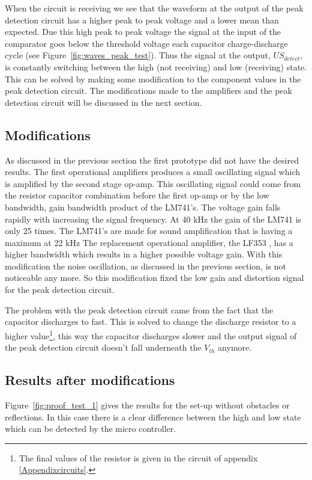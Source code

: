 When the circuit is receiving we see that the waveform at the output of the peak detection circuit has a higher peak to peak voltage and a lower mean than expected.
Due this high peak to peak voltage the signal at the input of the comparator goes below the threshold voltage each capacitor charge-discharge cycle (see Figure~\ref{fig:waves_peak_test}).
Thus the signal at the output, $US_{detect}$, is constantly switching between the high (not receiving) and low (receiving) state.
This can be solved by making some modification to the component values in the peak detection circuit.
The modifications made to the amplifiers and the peak detection circuit will be discussed in the next section.


\subsection{Modifications}
\label{chap:mod}
As discussed in the previous section the first prototype did not have the desired results. The first operational amplifiers produces a small oscillating signal which is amplified by the second stage op-amp. This oscillating signal could come from the resistor capacitor combination before the first op-amp or by the low bandwidth, gain bandwidth product of the LM741's. The voltage gain falls rapidly with increasing the signal frequency. At 40 kHz the gain of the LM741 is only 25 times. The LM741's are made for sound amplification that is having a maximum at 22 kHz The replacement operational amplifier, the LF353 \cite{LF353}, has a higher bandwidth which results in a higher possible voltage gain. With this modification the noise oscillation, as discussed in the previous section, is not noticeable any more. So this modification fixed the low gain and distortion signal for the peak detection circuit.

The problem with the peak detection circuit came from the fact that the capacitor discharges to fast. This is solved to change the discharge resistor to a higher value\footnote{The final values of the resistor is given in the circuit of appendix \ref{Appendixcircuits}.}, this way the capacitor discharges slower and the output signal of the peak detection circuit doesn't fall underneath the $V_{th}$ anymore.


\subsection{Results after modifications}

Figure~\ref{fig:proof_test_1} gives the results for the set-up without obstacles or reflections.
In this case there is a clear difference between the high and low state which can be detected by the micro controller.

